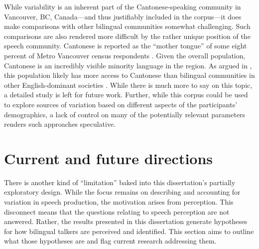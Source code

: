 While variability is an inherent part of the Cantonese-speaking community in Vancouver, BC, Canada---and thus justifiably included in the corpus---it does make comparisons with other bilingual communities somewhat challenging. Such comparisons are also rendered more difficult by the rather unique position of the speech community. Cantonese is reported as the ``mother tongue'' of some eight percent of Metro Vancouver census respondents \citep{statistics_2017_proportion}. Given the overall population, Cantonese is an incredibly visible minority language in the region. As argued in \citet{chan_2020_lexically}, this population likely has more access to Cantonese than bilingual communities in other English-dominant societies \citep[e.g.,][]{bruggeman_2019_l1}. While there is much more to say on this topic, a detailed study is left for future work. Further, while this corpus could be used to explore sources of variation based on different aspects of the participants' demographics, a lack of control on many of the potentially relevant parameters renders such approaches speculative. 

\section{Current and future directions}\label{ch5:sec:directions}

There is another kind of ``limitation'' baked into this dissertation's partially exploratory design. While the focus remains on describing and accounting for variation in speech production, the motivation arises from perception. This disconnect means that the questions relating to speech perception are not answered. Rather, the results presented in this dissertation generate hypotheses for how bilingual talkers are perceived and identified. This section aims to outline what those hypotheses are and flag current research addressing them. 




